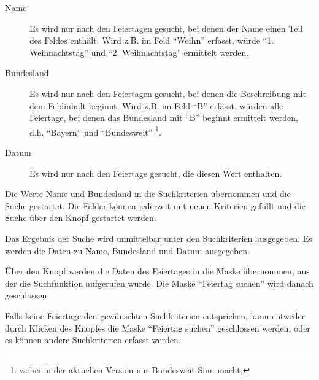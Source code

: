 \begin{description}
\item[Name] 
Es wird nur nach den Feiertagen gesucht, bei denen der Name
einen Teil des Feldes enthält.
Wird z.B. im Feld  ``Weihn'' erfasst,
würde ``1. Weihnachtstag'' und ``2. Weihnachtstag'' ermittelt werden.
\item[Bundesland] 
Es wird nur nach den Feiertagen gesucht, bei denen die
Beschreibung mit dem Feldinhalt beginnt. Wird z.B. im Feld 
 ``B'' erfasst,
würden alle Feiertage, bei denen das Bundesland mit ``B'' beginnt 
ermittelt werden, d.h. ``Bayern'' und ``Bundesweit''
\footnote{wobei in der aktuellen Version nur Bundesweit Sinn macht,}.
\item[Datum] Es wird nur nach den Feiertage gesucht, die diesen Wert
enthalten.
\end{description}

Die Werte Name und Bundesland
in die Suchkriterien übernommen und die Suche gestartet.
Die Felder können jederzeit mit neuen Kriterien gefüllt und die Suche
über den Knopf  gestartet werden.

Das Ergebnis der Suche wird unmittelbar unter den Suchkriterien ausgegeben.
Es werden die Daten zu Name, Bundesland und Datum ausgegeben.

Über den Knopf  werden die Daten des Feiertages in die Maske
übernommen, aus der die Suchfunktion aufgerufen wurde. Die Maske
``Feiertag suchen''
wird danach geschlossen.

Falls keine Feiertage den gewünschten Suchkriterien entsprichen, kann entweder
durch Klicken des Knopfes  die Maske ``Feiertag suchen''
geschlossen werden, oder es können andere Suchkriterien erfasst werden.


